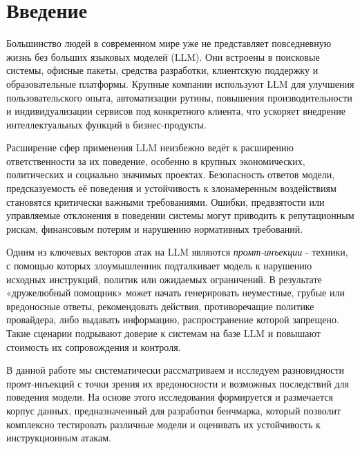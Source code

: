 
\section*{Введение}
\thispagestyle{withCompileDate}

Большинство людей в современном мире уже не представляет повседневную жизнь без больших языковых моделей (LLM). Они встроены в поисковые системы, офисные пакеты, средства разработки, клиентскую поддержку и образовательные платформы. Крупные компании используют LLM для улучшения пользовательского опыта, автоматизации рутины, повышения производительности и индивидуализации сервисов под конкретного клиента, что ускоряет внедрение интеллектуальных функций в бизнес-продукты.

Расширение сфер применения LLM неизбежно ведёт к расширению ответственности за их поведение, особенно в крупных экономических, политических и социально значимых проектах. Безопасность ответов модели, предсказуемость её поведения и устойчивость к злонамеренным воздействиям становятся критически важными требованиями. Ошибки, предвзятости или управляемые отклонения в поведении системы могут приводить к репутационным рискам, финансовым потерям и нарушению нормативных требований.

Одним из ключевых векторов атак на LLM являются \emph{промт-инъекции} - техники, с помощью которых злоумышленник подталкивает модель к нарушению исходных инструкций, политик или ожидаемых ограничений. В результате «дружелюбный помощник» может начать генерировать неуместные, грубые или вредоносные ответы, рекомендовать действия, противоречащие политике провайдера, либо выдавать информацию, распространение которой запрещено. Такие сценарии подрывают доверие к системам на базе LLM и повышают стоимость их сопровождения и контроля.

В данной работе мы систематически рассматриваем и исследуем разновидности промт-инъекций с точки зрения их вредоносности и возможных последствий для поведения модели. На основе этого исследования формируется и размечается корпус данных, предназначенный для разработки бенчмарка, который позволит комплексно тестировать различные модели и оценивать их устойчивость к инструкционным атакам.
